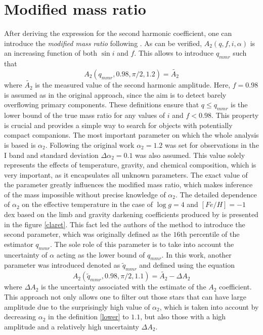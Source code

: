 \documentclass{pracalicmgr}
\begin{document}
\section{Modified mass ratio}
After deriving the expression for the second harmonic coefficient, one can introduce the {{\it modified mass ratio}} following \citet{gomel_search_2021-2}. 
As can be verified, $A_2(q,f,i,\alpha)$ is an increasing
function of both $\sin{i}$ and $f$. This allows to introduce $q_{mmr}$ such that
\begin{equation}\label{qmmr}
    A_2(q_{mmr},0.98,\pi/2,1.2)=\tilde{A_2}
\end{equation}
where $\tilde{A_2}$ is the measured value of the second harmonic amplitude.
Here, $f=0.98$ is assumed as in the original approach, since the aim is to detect barely overflowing primary components.
These definitions ensure that $q\leq q_{mmr}$ is the lower bound of the true mass ratio for any values of $i$ and $f<0.98$. 
This property is crucial and provides a simple way to search for objects with potentially compact companions.
The most important parameter on which the whole analysis is based is $\alpha_2$.
Following the original work $\alpha_2=1.2$ was set for observations in the I band and standard deviation $\Delta\alpha_2=0.1$
was also assumed. This value
solely represents the effects of temperature, gravity, and chemical composition, which is very important, as it encapsulates all unknown parameters. 
The exact value of the parameter greatly influences the modified mass ratio, which makes inference of the mass impossible without precise knowledge of $\alpha_2$.
The detailed dependence of $\alpha_2$ on the effective temperature in the case of $\log g=4$ and $[Fe/H]=-1$ dex based on the limb and gravity darkening coefficients produced by
\citet{claret_new_2000} is presented in the figure \ref{claret}.
This fact led the authors of the method to introduce the second parameter, which was originally defined as the $16$th percentile of the estimator $q_{mmr}$. The sole role of this
parameter is to take into account the uncertainty of $\alpha$ acting as the lower bound of $q_{mmr}$. In this work, another parameter was introduced denoted as $\tilde{q}_{mmr}$ and defined
using the equation
\begin{equation*}\label{lower}
    A_2(\tilde{q}_{mmr},0.98,\pi/2,1.1)=\tilde{A_2}-\Delta A_2
\end{equation*}
where $\Delta A_2$ is the uncertainty associated with the estimate of the $A_2$ coefficient. This approach not only allows one to filter out those stars that can have large amplitude due to
the surprisingly high value of $\alpha_2$, which is taken into account by decreasing $\alpha_2$ in the definition \ref{lower} to $1.1$, but also those with
a high amplitude and a relatively high uncertainty $\Delta A_2$.
\end{document}
